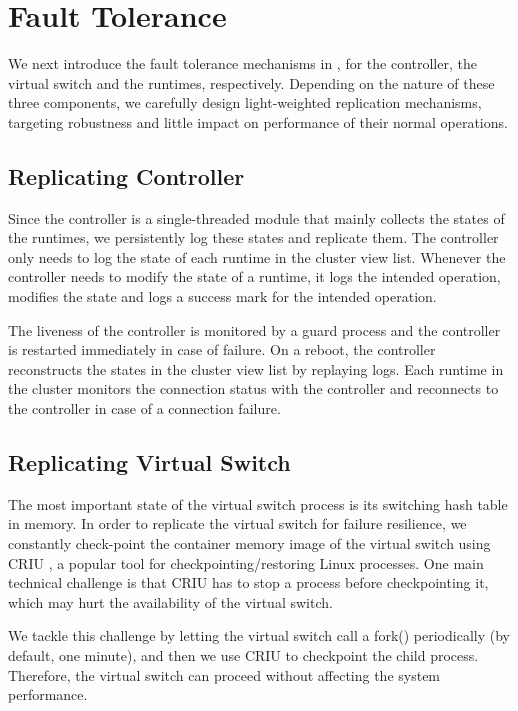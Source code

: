 \section{Fault Tolerance}
\label{sec:ft}

We next introduce the fault tolerance mechanisms in \nfactor, for the controller, the virtual switch and the runtimes, respectively. 
Depending on the nature of these three components, we carefully design 
light-weighted replication mechanisms, targeting robustness and little impact on performance of their normal operations.

\subsection{Replicating Controller}

Since the controller is a single-threaded module that mainly collects the states of 
the runtimes, we persistently log these states and replicate them. The 
controller only needs to log the state of each runtime in 
the cluster view list. Whenever the controller needs to modify the state of a 
runtime, it logs the intended operation, modifies the state and logs a success 
mark for the intended operation.

The liveness of the controller is monitored by a guard process and the 
controller is restarted immediately in case of failure. On a reboot, the 
controller reconstructs the states in the cluster view list by replaying logs. 
Each runtime in the cluster monitors the connection status with the controller 
and reconnects to the controller in case of a connection failure.

\subsection{Replicating Virtual Switch}

The most important state of the virtual switch process is its switching hash 
table in memory. In order to replicate the virtual switch for failure resilience, we constantly 
check-point the container memory image of the virtual switch using CRIU 
\cite{criu}, a popular tool for checkpointing/restoring Linux processes. One main 
technical challenge is that CRIU has to stop a process before checkpointing it, 
which may hurt the availability of the virtual switch.

We tackle this challenge by letting the virtual switch call a 
fork() periodically (by default, one minute), and then we use CRIU to checkpoint 
the child process. Therefore, the virtual switch can proceed without affecting 
the system performance.


